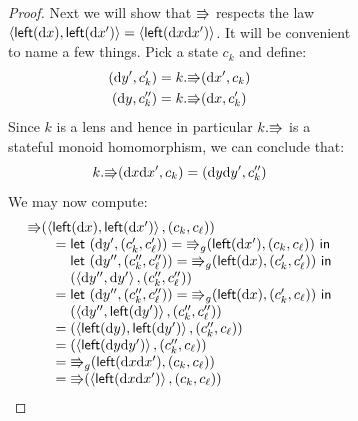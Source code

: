 \begin{figure}
\begin{figure}
\begin{proof}
Next we will show that $\mathord{\Rrightarrow}$ respects the law
$\left<\mathsf{left}(\textrm{d} x),\mathsf{left}(\textrm{d} x')\right>=\left<\mathsf{left}(\textrm{d} x\textrm{d} x')\right>$. It
will be convenient to name a few things. Pick a state $c_k$ and define:
\begin{align*}
    (\textrm{d} y',c_k') &= k.\mathord{\Rrightarrow}(\textrm{d} x',c_k) \\
    (\textrm{d} y,c_k'') &= k.\mathord{\Rrightarrow}(\textrm{d} x,c_k')
\end{align*}
Since $k$ is a lens and hence in particular $k.\mathord{\Rrightarrow}$ is a stateful monoid
homomorphism, we can conclude that:
\[k.\mathord{\Rrightarrow}(\textrm{d} x\textrm{d} x',c_k)=(\textrm{d} y\textrm{d} y',c_k'')\]
We may now compute:
\[\begin{array}{l}
    \dputr(\blist\mlleft\dx\mlist\mlleft{\dx'}\elist,(c_k,c_\ell)) \\
    \qquad=
        \mllet (\dy',(c_k',c_\ell')) = \dputr\gen(\mlleft{\dx'},(c_k,c_\ell)) \mline \\
    \qquad{\phantom{={}}}
        \mllet (\dy'',(c_k'',c_\ell'')) = \dputr\gen(\mlleft\dx,(c_k',c_\ell')) \mline \\
    \qquad{\phantom{={}}}
        (\blist\dy''\mlist\dy'\elist,(c_k'',c_\ell'')) \\
    \qquad=
        \mllet (\dy'',(c_k'',c_\ell'')) = \dputr\gen(\mlleft\dx,(c_k',c_\ell)) \mline \\
    \qquad{\phantom{={}}}
        (\blist\dy''\mlist\mlleft{\dy'}\elist,(c_k'',c_\ell'')) \\
    \qquad=
        (\blist\mlleft\dy\mlist\mlleft{\dy'}\elist,(c_k'',c_\ell)) \\
    \qquad=
        (\blist\mlleft{\dy\dy'}\elist,(c_k'',c_\ell)) \\
    \qquad=
        \dputr\gen(\mlleft{\dx\dx'},(c_k,c_\ell)) \\
    \qquad=
        \dputr(\blist\mlleft{\dx\dx'}\elist,(c_k,c_\ell))
\end{array}\]


\end{proof}
\end{figure}
\end{figure}
